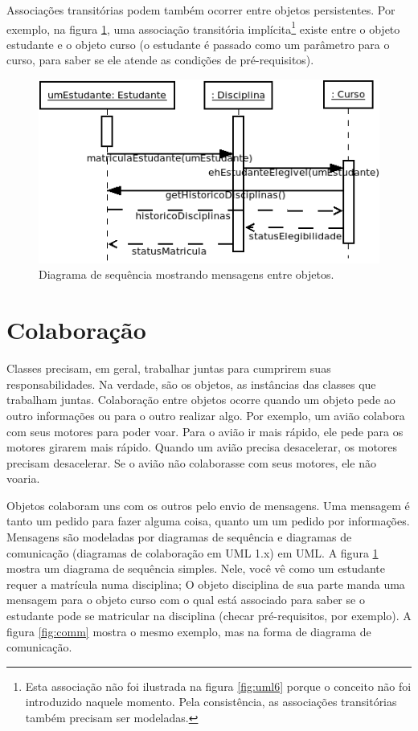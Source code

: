 \documentclass[
	article,			%
	12pt,				%
	openright,
	twoside,			%
	a4paper,			%
	english,			%
	french,
	brazil,				%
	sumario=tradicional
	]{abntex2}
\begin{document}
Associações transitórias podem também ocorrer entre objetos persistentes. Por exemplo, na figura \ref{fig:seq}, uma associação transitória implícita\footnote{Esta associação não foi ilustrada na figura \ref{fig:uml6} porque o conceito não foi introduzido naquele momento. Pela consistência, as associações transitórias também  precisam ser modeladas.} existe entre o objeto estudante e o objeto curso (o estudante é passado como um parâmetro para o curso, para saber se ele atende as condições de pré-requisitos).

\begin{figure}[h]
\begin{center}
\includegraphics[scale=0.65]{clsSeq.png}
\end{center}
\caption{Diagrama de sequência mostrando mensagens entre objetos.} \label{fig:seq}
\end{figure}

\section{Colaboração}

Classes precisam, em geral, trabalhar juntas para cumprirem suas responsabilidades. Na verdade, são os objetos, as instâncias das classes que trabalham juntas. Colaboração entre objetos ocorre quando um objeto pede ao outro informações ou para o outro realizar algo. Por exemplo, um avião colabora com seus motores para poder voar. Para o avião ir mais rápido, ele pede para os motores girarem mais rápido. Quando um avião precisa desacelerar, os motores precisam desacelerar. Se o avião não colaborasse com seus motores, ele não voaria.

Objetos colaboram uns com os outros pelo envio de mensagens. Uma mensagem é tanto um pedido para fazer alguma coisa, quanto um um pedido por informações. Mensagens são modeladas por diagramas de sequência e diagramas de comunicação (diagramas de colaboração em UML 1.x) em UML. A figura \ref{fig:seq} mostra um diagrama de sequência simples. Nele, você vê como um estudante requer a matrícula numa disciplina; O objeto disciplina de sua parte manda uma mensagem para o objeto curso com o qual está associado para saber se o estudante pode se matricular na disciplina (checar pré-requisitos, por exemplo). A figura \ref{fig:comm} mostra o mesmo exemplo, mas na forma de diagrama de comunicação.
\end{document}
